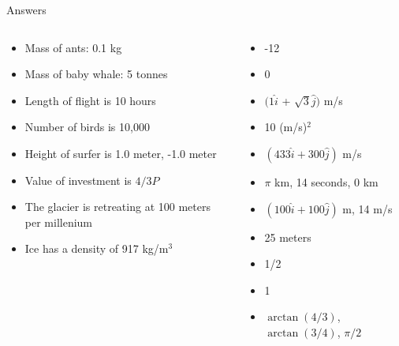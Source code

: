 \documentclass{beamer}
\begin{document}
\begin{frame}{Answers}
\begin{columns}[T]
\begin{column}{0.5\textwidth}
\begin{itemize}
\item Mass of ants: 0.1 kg
\item Mass of baby whale: 5 tonnes
\item Length of flight is 10 hours
\item Number of birds is 10,000
\item Height of surfer is 1.0 meter, -1.0 meter
\item Value of investment is $4/3 P$
\item The glacier is retreating at 100 meters per millenium
\item Ice has a density of 917 kg/m$^3$
\end{itemize}
\end{column}
\begin{column}{0.5\textwidth}
\begin{itemize}
\item -12
\item 0
\item $(1\hat{i}$ + $\sqrt{3}\hat{j})$  m/s
\item 10 (m/s)$^2$
\item $(433\hat{i}+300\hat{j})$ m/s
\item $\pi$ km, 14 seconds, $0$ km
\item $(100\hat{i} + 100\hat{j})$ m, 14 m/s
\item 25 meters
\item 1/2
\item 1
\item $\arctan(4/3)$, $\arctan(3/4)$, $\pi/2$
\end{itemize}
\end{column}
\end{columns}
\end{frame}
\end{document}

